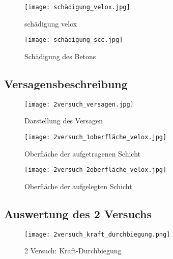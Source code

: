 \documentclass[12 pt,a4 paper ]{scrreprt}
\begin{document}
\begin{figure}
\begin{minipage}[hbt]{7cm}	
	\texttt{[image: schädigung\_velox.jpg]}
	\caption{schädigung velox}
	\label{schädigung velox}
\end{minipage}
\hfill
\begin{minipage}[hbt]{7cm}
	\texttt{[image: schädigung\_scc.jpg]}
	\caption{Schädigung des Betons}
	\label{schädigung scc}
\end{minipage}
\end{figure}



\subsection{Versagensbeschreibung}



\begin{figure}
\begin{center}
\texttt{[image: 2versuch\_versagen.jpg]}
\caption{Darstellung des Versagen}
\label{2versuch versagen}
\end{center}
\end{figure}



\begin{figure}
\begin{minipage}[hbt]{7cm}	
	\texttt{[image: 2versuch\_1oberfläche\_velox.jpg]}
	\caption{Oberfläche der aufgetragenen Schicht}
	\label{schädigung velox}
\end{minipage}
\hfill
\begin{minipage}[hbt]{7cm}
	\texttt{[image: 2versuch\_2oberfläche\_velox.jpg]}
	\caption{Oberfläche der aufgelegten Schicht}
	\label{schädigung scc}
\end{minipage}
\end{figure}

\subsection{Auswertung des 2 Versuchs}

\begin{figure}
\begin{center}
\texttt{[image: 2versuch\_kraft\_durchbiegung.png]}
\caption{2 Versuch: Kraft-Durchbiegung}
\label{2 Versuch: Kraft-Durchbiegung}
\end{center}
\end{figure}
\end{document}
